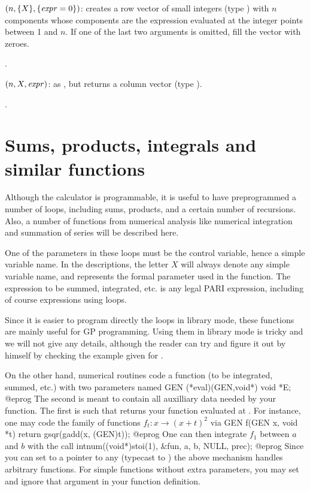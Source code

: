 $(n,\{X\},\{\hbox{\it expr\/}=0\})$: creates a row vector of small integers (type
) with $n$ components whose components are the expression
 evaluated at the integer points between 1 and $n$. If one of the
last two arguments is omitted, fill the vector with zeroes.

.

$(n,X,\hbox{\it expr\/})$: as , but returns a
column vector (type ).

.

\section{Sums, products, integrals and similar functions}
\label{se:sums}

Although the  calculator is programmable, it is useful to have
preprogrammed a number of loops, including sums, products, and a certain
number of recursions. Also, a number of functions from numerical analysis
like numerical integration and summation of series will be described here.

One of the parameters in these loops must be the control variable, hence a
simple variable name. In the descriptions, the letter $X$ will always denote
any simple variable name, and represents the formal parameter used in the
function. The expression to be summed, integrated, etc. is any legal PARI
expression, including of course expressions using loops.

Since it is easier to program directly the loops in library mode, these
functions are mainly useful for GP programming. Using them in library mode is
tricky and we will not give any details, although the reader can try and figure
it out by himself by checking the example given for .

On the other hand, numerical routines code a function (to be integrated,
summed, etc.) with two parameters named
\bprog
  GEN (*eval)(GEN,void*)
  void *E;
@eprog\noindent
The second is meant to contain all auxilliary data needed by your function.
The first is such that  returns your function evaluated at
. For instance, one may code the family of functions
$f_t: x \to (x+t)^2$ via
\bprog
GEN f(GEN x, void *t) { return gsqr(gadd(x, (GEN)t)); }
@eprog\noindent
One can then integrate $f_1$ between $a$ and $b$ with the call
\bprog
intnum((void*)stoi(1), &fun, a, b, NULL, prec);
@eprog\noindent
Since you can set  to a pointer to any  (typecast to
) the above mechanism handles arbitrary functions. For simple
functions without extra parameters, you may set  and ignore
that argument in your function definition.

